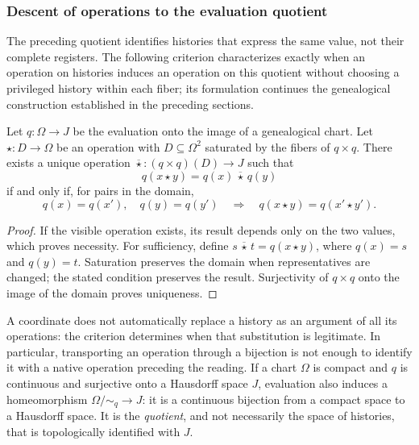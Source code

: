 \subsubsection{Descent of operations to the evaluation quotient}
\label{sec:ch-descenso-fibras}

The preceding quotient identifies histories that express the same value, not
their complete registers. The following criterion characterizes exactly when
an operation on histories induces an operation on this quotient without
choosing a privileged history within each fiber; its formulation continues
the genealogical construction established in the preceding sections.

\begin{proposition}
\label{prop:ch-descenso-fibras}
Let \(q:\Omega\to J\) be the evaluation onto the image of a genealogical
chart. Let \(\star:D\to\Omega\) be an operation with
\(D\subseteq\Omega^2\) saturated by the fibers of \(q\times q\). There
exists a unique operation \(\overline\star:(q\times q)(D)\to J\) such that
\[
 q(x\star y)=q(x)\,\overline\star\,q(y)
\]
if and only if, for pairs in the domain,
\[
 q(x)=q(x'),\quad q(y)=q(y')
 \quad\Longrightarrow\quad q(x\star y)=q(x'\star y').
\]
\end{proposition}

\begin{proof}
If the visible operation exists, its result depends only on the two values,
which proves necessity. For sufficiency, define
\(s\,\overline\star\,t=q(x\star y)\), where \(q(x)=s\) and
\(q(y)=t\). Saturation preserves the domain when representatives are changed;
the stated condition preserves the result. Surjectivity of \(q\times q\)
onto the image of the domain proves uniqueness.
\end{proof}

A coordinate does not automatically replace a history as an argument of all
its operations: the criterion determines when that substitution is
legitimate. In particular, transporting an operation through a bijection is
not enough to identify it with a native operation preceding the reading. If
a chart \(\Omega\) is compact and \(q\) is continuous and surjective onto
a Hausdorff space \(J\), evaluation also induces a homeomorphism
\(\Omega/{\sim_q}\to J\): it is a continuous bijection from a compact
space to a Hausdorff space. It is the \emph{quotient}, and not necessarily
the space of histories, that is topologically identified with \(J\).
